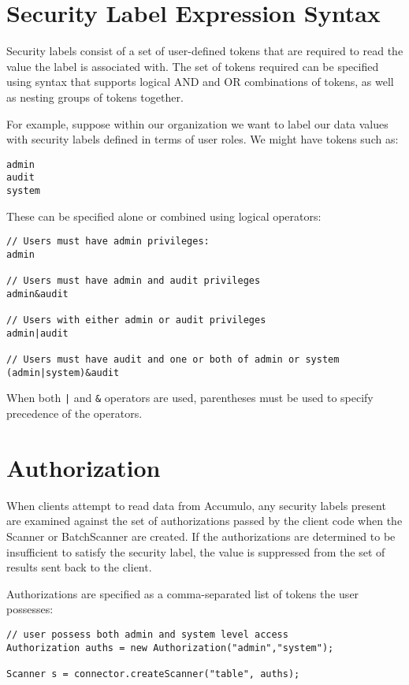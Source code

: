 \section{Security Label Expression Syntax}

Security labels consist of a set of user-defined tokens that are required to read the
value the label is associated with. The set of tokens required can be specified using
syntax that supports logical AND and OR combinations of tokens, as well as nesting
groups of tokens together.

For example, suppose within our organization we want to label our data values with
security labels defined in terms of user roles. We might have tokens such as:

\small
\begin{verbatim}
admin
audit
system
\end{verbatim}
\normalsize

These can be specified alone or combined using logical operators:

\small
\begin{verbatim}
// Users must have admin privileges:
admin

// Users must have admin and audit privileges
admin&audit

// Users with either admin or audit privileges
admin|audit

// Users must have audit and one or both of admin or system
(admin|system)&audit
\end{verbatim}
\normalsize

When both \verb^|^ and \verb^&^ operators are used, parentheses must be used to specify
precedence of the operators.

\section{Authorization}

When clients attempt to read data from Accumulo, any security labels present are
examined against the set of authorizations passed by the client code when the
Scanner or BatchScanner are created. If the authorizations are determined to be
insufficient to satisfy the security label, the value is suppressed from the set of
results sent back to the client.

Authorizations are specified as a comma-separated list of tokens the user possesses:

\small
\begin{verbatim}
// user possess both admin and system level access
Authorization auths = new Authorization("admin","system");

Scanner s = connector.createScanner("table", auths);
\end{verbatim}
\normalsize

